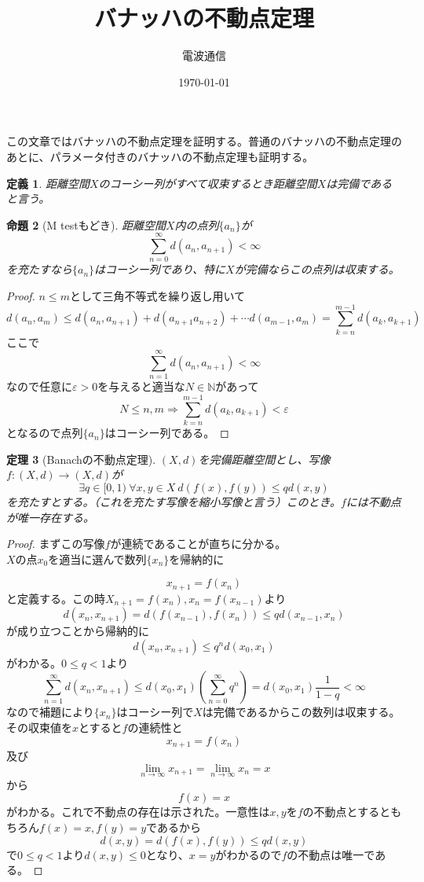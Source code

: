 \documentclass{jsarticle}
\title{バナッハの不動点定理}
\author{電波通信}
\date{\today}
\newtheorem{thm}{定理}
\newtheorem{prop}[thm]{命題}
\newtheorem{df}[thm]{定義}
\newcommand{\To}{\Longrightarrow}
\newcommand{\nn}{\mathbb{N}}
\newcommand{\mgn}{\infty}
\begin{document}
\maketitle

この文章ではバナッハの不動点定理を証明する。普通のバナッハの不動点定理のあとに、パラメータ付きのバナッハの不動点定理も証明する。

\begin{df}
距離空間$X$のコーシー列がすべて収束するとき距離空間$X$は完備であると言う。
\end{df}

\begin{prop}[M testもどき]
距離空間$X$内の点列$\{a_n\}$が
\[
\sum_{n=0}^{\mgn}d(a_n,a_{n+1})<\mgn
\]
を充たすなら$\{a_n\}$はコーシー列であり、特に$X$が完備ならこの点列は収束する。
\end{prop}
\begin{proof}
$n\le m$として三角不等式を繰り返し用いて
\[
d(a_n,a_m)\le d(a_n,a_{n+1})+d(a_{n+1}a_{n+2})+\cdots d(a_{m-1},a_m)=\sum_{k=n}^{m-1}d(a_k,a_{k+1})
\]
ここで
\[
\sum_{n=1}^{\mgn}d(a_n,a_{n+1})<\mgn
\]
なので任意に$\varepsilon>0$を与えると適当な$N\in \nn$があって
\[
N\le n,m\To \sum_{k=n}^{m-1}d(a_k,a_{k+1})<\varepsilon
\]
となるので点列$\{a_n\}$はコーシー列である。
\end{proof}

\begin{thm}[Banachの不動点定理]$(X,d)$を完備距離空間とし、写像$f:(X,d)\to (X,d)$が
\[
\exists q\in [0,1)\ \forall x,y \in X\ d(f(x),f(y))\le qd(x,y)
\]
を充たすとする。（これを充たす写像を縮小写像と言う）このとき。$f$には不動点が唯一存在する。
\end{thm}
\begin{proof}まずこの写像$f$が連続であることが直ちに分かる。\\ 
$X$の点$x_0$を適当に選んで数列$\{x_n\}$を帰納的に

\[
x_{n+1}=f(x_n)
\]
と定義する。この時$X_{n+1}=f(x_n),x_n=f(x_{n-1})$より
\[
d(x_n,x_{n+1})=d(f(x_{n-1}),f(x_n))\le qd(x_{n-1},x_n)
\]
が成り立つことから帰納的に
\[
d(x_n,x_{n+1})\le q^{n}d(x_0,x_1)
\]
がわかる。$0\le q<1$より
\[
\sum_{n=1}^{\mgn}d(x_n,x_{n+1})\le d(x_0,x_1)\left(\sum_{n=0}^{\mgn}q^n\right)=d(x_0,x_1)\frac{1}{1-q}<\mgn
\]
なので補題により$\{x_n\}$はコーシー列で$X$は完備であるからこの数列は収束する。その収束値を$x$とすると$f$の連続性と
\[
x_{n+1}=f(x_n)
\]
及び
\[
\lim_{n\to \mgn}x_{n+1}=\lim_{n\to \mgn}x_n=x
\]
から
\[
f(x)=x
\]
がわかる。これで不動点の存在は示された。一意性は$x,y$を$f$の不動点とするともちろん$f(x)=x,f(y)=y$であるから
\[
d(x,y)=d(f(x),f(y))\le qd(x,y)
\]
で$0\le q<1$より$d(x,y)\le0$となり、$x=y$がわかるので$f$の不動点は唯一である。
\end{proof}
\end{document}
